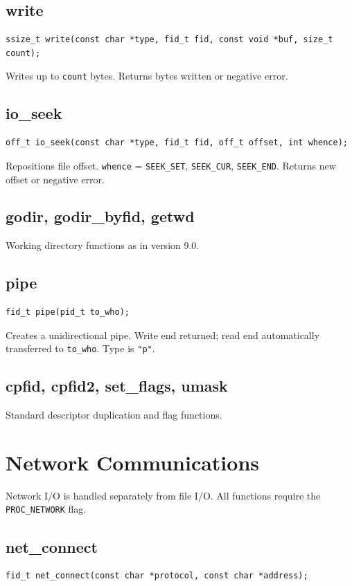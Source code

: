 \documentclass[12pt,a4paper]{article}
\begin{document}
\subsection{write}
\begin{lstlisting}
ssize_t write(const char *type, fid_t fid, const void *buf, size_t count);
\end{lstlisting}
Writes up to \texttt{count} bytes. Returns bytes written or negative error.

\subsection{io\_seek}
\begin{lstlisting}
off_t io_seek(const char *type, fid_t fid, off_t offset, int whence);
\end{lstlisting}
Repositions file offset. \texttt{whence} = \texttt{SEEK\_SET}, \texttt{SEEK\_CUR}, \texttt{SEEK\_END}. Returns new offset or negative error.

\subsection{godir, godir\_byfid, getwd}
Working directory functions as in version 9.0.

\subsection{pipe}
\begin{lstlisting}
fid_t pipe(pid_t to_who);
\end{lstlisting}
Creates a unidirectional pipe. Write end returned; read end automatically transferred to \texttt{to\_who}. Type is \texttt{"p"}.

\subsection{cpfid, cpfid2, set\_flags, umask}
Standard descriptor duplication and flag functions.

\section{Network Communications}
\label{sec:network}

Network I/O is handled separately from file I/O. All functions require the \texttt{PROC\_NETWORK} flag.

\subsection{net\_connect}
\begin{lstlisting}
fid_t net_connect(const char *protocol, const char *address);
\end{lstlisting}
\end{document}

